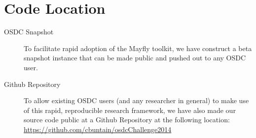 \documentclass[10pt,a4]{article}
\begin{document}
\appendix
\section{Code Location}

\begin{description}
\item[OSDC Snapshot] To facilitate rapid adoption of the Mayfly toolkit, we have construct a beta snapshot instance that can be made public and pushed out to any OSDC user.
\item[Github Repository] To allow existing OSDC users (and any researcher in general) to make use of this rapid, reproducible research framework, we have also made our source code public at a Github Repository at the following location: \url{https://github.com/cbuntain/osdcChallenge2014}
\end{description}
\end{document}

